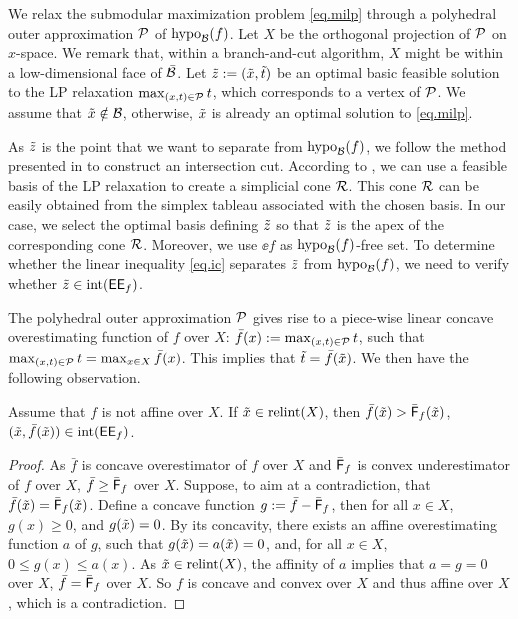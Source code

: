 We relax the submodular maximization problem \eqref{eq.milp} through a polyhedral outer approximation $\mathcal P$ of $\operatorname{hypo}_{\mathcal B}(f)$. Let $X$ be the orthogonal projection of $\mathcal P$ on $x$-space. We remark that, within a branch-and-cut algorithm, $X$ might be within a low-dimensional face of $\bar{\mathcal B}$. Let $\tilde{z}:=(\tilde{x}, \tilde{t})$ be an optimal basic feasible solution to the LP relaxation $\max_{(x,t) \in \mathcal P} t$, which corresponds to a vertex of $\mathcal P$. We assume that $\tilde{x} \notin \mathcal B$, otherwise, $\tilde{x}$ is already an optimal solution to \eqref{eq.milp}.


As $\tilde{z}$ is the point that we want to separate from $\operatorname{hypo}_{\mathcal B}(f)$, we follow the method presented in  to construct an  intersection cut. According to \cite{conforti1984submodular,gomory1969some},  we can use a feasible basis of the LP relaxation to create a simplicial cone $\mathcal R$. This cone $\mathcal R$ can be easily obtained from the simplex tableau associated with the chosen basis.  In our case,  we select  the optimal basis defining $\tilde{z}$ so that $\tilde{z}$ is the apex of the corresponding cone $\mathcal R$. Moreover, we use $\ee{f}$ as  $\operatorname{hypo}_{\mathcal B}(f)$-free set. To determine whether the linear inequality \eqref{eq.ic} separates $\tilde{z}$ from $\operatorname{hypo}_{\mathcal B}(f)$, we need to verify whether $\tilde{z} \in \operatorname{int}(\mathsf{EE}_{f} )$.


The polyhedral outer approximation $\mathcal P$ gives rise to a piece-wise linear concave overestimating function of $f$ over $X$: $\bar{f}(x) := \max_{(x,t) \in \mathcal P} t$,
such that $\max_{(x,t) \in \mathcal P} t = \max_{x \in X}\bar{f}(x)$. This implies that $\tilde{t} = \bar{f}(\tilde{x})$. We then have the following observation.  


\begin{proposition}
\label{prop.in}
Assume that $f$ is not affine over $X$. If $\tilde{x} \in \operatorname{relint}(X)$, then $\bar{f}(\tilde{x}) > \bar{\mathsf F}_{f}(\tilde{x})$, \ie $(\tilde{x}, \bar{f}(\tilde{x})) \in \operatorname{int}(\mathsf{EE}_{f} )$.
\end{proposition}
\begin{proof}
As $\bar{f}$ is concave overestimator of $f$ over $X$ and $\bar{\mathsf F}_{f}$ is convex  underestimator of $f$ over $X$, $\bar{f} \ge \bar{\mathsf F}_{f}$ over $X$.  Suppose, to aim at a contradiction, that  $\bar{f}(\tilde{x}) = \bar{\mathsf F}_{f}(\tilde{x})$. Define a concave function $g:= \bar{f} - \bar{\mathsf F}_{f}$, then for all $x \in X$, $g(x) \ge 0$, and $g(\tilde{x}) = 0$. By its concavity, there exists  an affine overestimating function $a$ of  $g$, such that $g(\tilde{x}) = a(\tilde{x}) = 0$, and, for all $x \in X$, $0 \le  g(x) \le a(x)$. As $\tilde{x} \in \operatorname{relint}(X)$, the affinity of $a$  implies that $a = g = 0$ over $X$, \ie $\bar{f}= \bar{\mathsf F}_{f}$ over $X$. So $f$ is concave and convex over $X$ and thus affine over $X$, which is a contradiction.
\end{proof}

